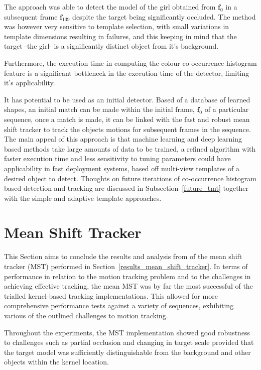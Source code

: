 The approach was able to detect the model of the girl obtained from
$\mathbf{f}_0$ in a subsequent frame $\mathbf{f}_{139}$ despite the target being
significantly occluded. 
The method was however very sensitive to template selection, with small
variations in template dimensions resulting in failures, and this keeping in
mind that the target -the girl- is a significantly distinct object from it's
background. 

Furthermore, the execution time in computing the colour co-occurrence histogram
feature is a significant bottleneck in the execution time of the detector,
limiting it's applicability. 

It has potential to be used as an initial detector. Based of a database of
learned shapes, an initial match can be made within the initial frame,
$\mathbf{f}_0$ of a particular sequence, once a match is made, it can be linked
with the fast and robust mean shift tracker to track the objects motions for
subsequent frames in the sequence. 
The main appeal of this approach is that machine learning and deep learning
based methods take large amounts of data to be trained, a refined algorithm with
faster execution time and less sensitivity to tuning parameters could have
applicability in fast deployment systems, based off multi-view templates of a
desired object to detect. Thoughts on future iterations of co-occurrence
histogram based detection and tracking are discussed in
Subsection~\ref{future_tmt} together with the simple and adaptive template
approaches.

\section{Mean Shift Tracker}
This Section aims to conclude the results and analysis from of the mean shift
tracker (MST) performed in Section~\ref{results_mean_shift_tracker}.
In terms of performance in relation to the motion tracking problem and to the
challenges in achieving effective tracking, the mean MST was by far
the most successful of the trialled kernel-based tracking implementations.
This allowed for more comprehensive performance tests against a variety of
sequences, exhibiting various of the outlined challenges to motion tracking.

Throughout the experiments, the MST implementation showed good robustness to
challenges such as partial occlusion and changing in target scale provided that
the target model was sufficiently distinguishable from the background and other
objects within the kernel location.

